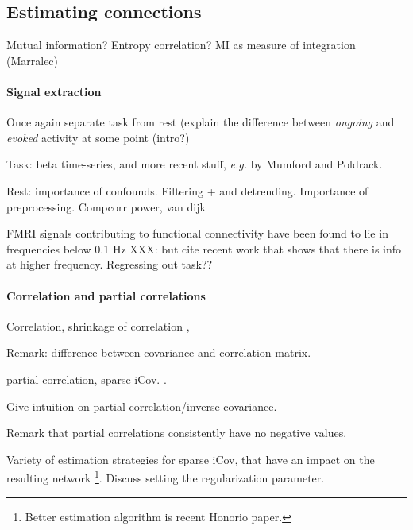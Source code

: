 \documentclass[5p]{elsarticle}
\begin{document}
\subsection{Estimating connections}

Mutual information? Entropy correlation? MI as measure of integration (Marralec)

\paragraph{Signal extraction}

Once again separate task from rest (explain the difference between
\emph{ongoing} and \emph{evoked} activity at some point (intro?)

Task: beta time-series, and more recent stuff, \emph{e.g.} by Mumford and
Poldrack.

Rest: importance of confounds. Filtering + and detrending. Importance of
preprocessing.
Compcorr \cite{behzadi2007}
\cite{chai2011}
power, van dijk
\cite{satterthwaite2012}

FMRI signals contributing to functional connectivity
have been found to lie in frequencies below 0.1 Hz \cite{cordes2000}
XXX: but cite recent work that shows that there is info at higher
frequency.  Regressing out task??

\paragraph{Correlation and partial correlations}

Correlation, shrinkage of correlation \cite{ledoit2004,varoquaux2012},

Remark: difference between covariance and correlation matrix.

partial correlation, sparse iCov. \cite{smith2011,varoquaux2010b}. 

Give intuition on partial correlation/inverse covariance.

Remark that partial correlations consistently have no negative values.

Variety
of estimation strategies for sparse iCov, that have an impact on the
resulting network \cite{varoquaux2012}\footnote{Better estimation
algorithm is recent Honorio paper.}. Discuss setting the regularization
parameter.
\end{document}
